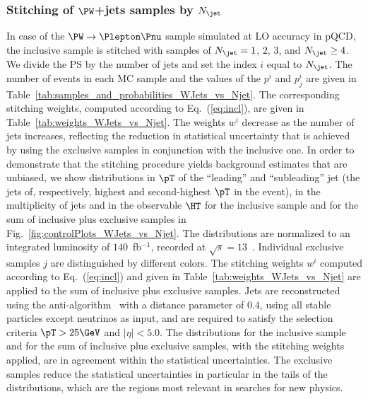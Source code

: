 \subsubsection{Stitching of $\PW$+jets samples by $N_{\jet}$}
\label{sec:WJets_vs_Njet}

In case of the $\PW \to \Plepton\Pnu$ sample simulated at LO accuracy in pQCD,
the inclusive sample is stitched with samples of $N_{\jet} = 1$, $2$, $3$, and $N_{\jet} \geq 4$.
We divide the PS by the number of jets and set the index $i$ equal to $N_{\jet}$.
The number of events in each MC sample and the values of the $p^{i}$ and $p_{j}^{i}$ are given in Table~\ref{tab:samples_and_probabilities_WJets_vs_Njet}.
The corresponding stitching weights, computed according to Eq.~(\ref{eq:incl}), are given in Table~\ref{tab:weights_WJets_vs_Njet}.
The weights $w^{i}$ decrease as the number of jets increases, 
reflecting the reduction in statistical uncertainty that is achieved by using the exclusive samples in conjunction with the inclusive one.
In order to demonstrate that the stitching procedure yields background estimates that are unbiased,
we show distributions in $\pT$ of the ``leading'' and ``subleading'' jet (the jets of, respectively, highest and second-highest $\pT$ in the event),
in the multiplicity of jets and in the observable $\HT$ 
for the inclusive sample and for the sum of inclusive plus exclusive samples in Fig.~\ref{fig:controlPlots_WJets_vs_Njet}.
The distributions are normalized to an integrated luminosity of $140$~fb$^{-1}$, recorded at $\sqrt{s}=13$~\TeV.
Individual exclusive samples $j$ are distinguished by different colors.
The stitching weights $w^{i}$ computed according to Eq.~(\ref{eq:incl}) and given in Table~\ref{tab:weights_WJets_vs_Njet} are applied to the sum of inclusive plus exclusive samples.
Jets are reconstructed using the anti-\kt algorithm~\cite{Cacciari:2008gp,Cacciari:2011ma} with a distance parameter of $0.4$,
using all stable particles except neutrinos as input, and are required to satisfy the selection criteria $\pT > 25\GeV$ and $\vert\eta\vert < 5.0$.
The distributions for the inclusive sample and for the sum of inclusive plus exclusive samples, with the stitching weights applied, are in agreement within the statistical uncertainties.
The exclusive samples reduce the statistical uncertainties in particular in the tails of the distributions,
which are the regions most relevant in searches for new physics.

